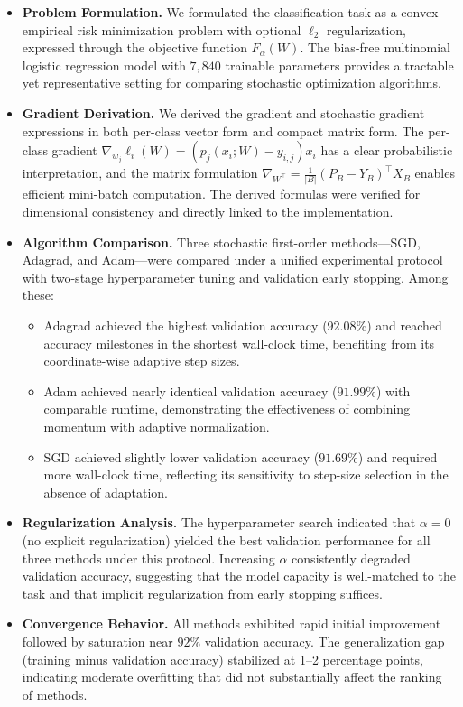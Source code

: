 \documentclass[11pt]{article}
\numberwithin{equation}{section}
\numberwithin{table}{section}
\numberwithin{figure}{section}
\numberwithin{algorithm}{section}
\begin{document}
\begin{itemize}
    \item \textbf{Problem Formulation.} We formulated the classification task as a convex empirical risk minimization problem with optional \(\ell_2\) regularization, expressed through the objective function \(F_\alpha(W)\). The bias-free multinomial logistic regression model with \(7{,}840\) trainable parameters provides a tractable yet representative setting for comparing stochastic optimization algorithms.
    
    \item \textbf{Gradient Derivation.} We derived the gradient and stochastic gradient expressions in both per-class vector form and compact matrix form. The per-class gradient \(\nabla_{w_j}\ell_i(W) = (p_j(x_i;W) - y_{i,j})x_i\) has a clear probabilistic interpretation, and the matrix formulation \(\nabla_{W^\top} = \frac{1}{|B|}(P_B - Y_B)^\top X_B\) enables efficient mini-batch computation. The derived formulas were verified for dimensional consistency and directly linked to the implementation.
    
    \item \textbf{Algorithm Comparison.} Three stochastic first-order methods---SGD, Adagrad, and Adam---were compared under a unified experimental protocol with two-stage hyperparameter tuning and validation early stopping. Among these:
    \begin{itemize}
        \item Adagrad achieved the highest validation accuracy (\(92.08\%\)) and reached accuracy milestones in the shortest wall-clock time, benefiting from its coordinate-wise adaptive step sizes.
        \item Adam achieved nearly identical validation accuracy (\(91.99\%\)) with comparable runtime, demonstrating the effectiveness of combining momentum with adaptive normalization.
        \item SGD achieved slightly lower validation accuracy (\(91.69\%\)) and required more wall-clock time, reflecting its sensitivity to step-size selection in the absence of adaptation.
    \end{itemize}
    
    \item \textbf{Regularization Analysis.} The hyperparameter search indicated that \(\alpha = 0\) (no explicit regularization) yielded the best validation performance for all three methods under this protocol. Increasing \(\alpha\) consistently degraded validation accuracy, suggesting that the model capacity is well-matched to the task and that implicit regularization from early stopping suffices.
    
    \item \textbf{Convergence Behavior.} All methods exhibited rapid initial improvement followed by saturation near \(92\%\) validation accuracy. The generalization gap (training minus validation accuracy) stabilized at 1--2 percentage points, indicating moderate overfitting that did not substantially affect the ranking of methods.
\end{itemize}
\end{document}

